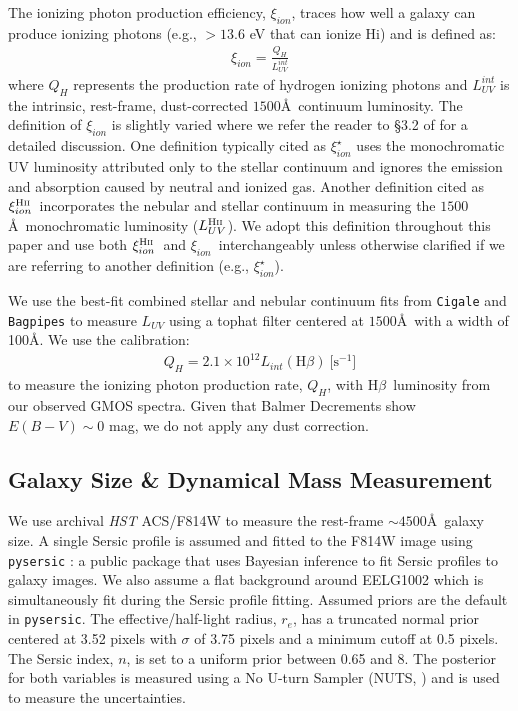 \documentclass[twocolumn,tight,times,linenumbers]{aastex631}
\newcommand{\hbeta}{H$\beta$}
\newcommand{\xiion}{$\xi_{ion}$}
\newcommand{\xiionHtwo}{$\xi_{ion}^\textrm{H{\sc ii}}$}
\begin{document}
	The ionizing photon production efficiency, \xiion, traces how well a galaxy can produce ionizing photons (e.g., $> 13.6$ eV that can ionize H{\sc i}) and is defined as:
	\begin{eqnarray}
		\textrm{\xiion} = \frac{Q_H}{L_{UV}^{int}}
		\label{eqn:xiion}
	\end{eqnarray}
	where $Q_H$ represents the production rate of hydrogen ionizing photons and $L_{UV}^{int}$ is the intrinsic, rest-frame, dust-corrected $1500$\AA~continuum luminosity. The definition of $\xi_{ion}$ is slightly varied where we refer the reader to \S3.2 of \cite{Chevallard2018} for a detailed discussion. One definition typically cited as $\xi_{ion}^\star$ uses the monochromatic UV luminosity attributed only to the stellar continuum and ignores the emission and absorption caused by neutral and ionized gas. Another definition cited as \xiionHtwo~incorporates the nebular and stellar continuum in measuring the $1500$\AA~monochromatic luminosity ($L_{UV}^\textrm{H{\sc ii}}$). We adopt this definition throughout this paper and use both \xiionHtwo~and \xiion~interchangeably unless otherwise clarified if we are referring to another definition (e.g., $\xi_{ion}^\star$).
	
	We use the best-fit combined stellar and nebular continuum fits from \texttt{Cigale} and \texttt{Bagpipes} to measure $L_{UV}$ using a tophat filter centered at $1500$\AA~with a width of 100\AA. We use the \cite{Leitherer1995} calibration:
	\begin{eqnarray}
		Q_H = 2.1\times10^{12} L_{int}(\textrm{H}\beta)~\textrm{[s$^{-1}$]}
	\end{eqnarray}
	to measure the ionizing photon production rate, $Q_H$, with \hbeta~luminosity from our observed GMOS spectra. Given that Balmer Decrements show $E(B-V) \sim 0$ mag, we do not apply any dust correction.

	\subsection{Galaxy Size \& Dynamical Mass Measurement}
	\label{sec:dynamical_mass}
	
	We use archival \textit{HST} ACS/F814W to measure the rest-frame $\sim 4500$\AA~galaxy size. A single Sersic profile is assumed and fitted to the F814W image using \texttt{pysersic} \citep{Pasha2023}: a public package that uses Bayesian inference to fit Sersic profiles to galaxy images. We also assume a flat background around EELG1002 which is simultaneously fit during the Sersic profile fitting. Assumed priors are the default in \texttt{pysersic}. The effective/half-light radius, $r_{e}$, has a truncated normal prior centered at 3.52 pixels with $\sigma$ of 3.75 pixels and a minimum cutoff at 0.5 pixels. The Sersic index, $n$, is set to a uniform prior between 0.65 and 8. The posterior for both variables is measured using a No U-turn Sampler (NUTS, \citealt{Hoffman2014}) and is used to measure the uncertainties.
	
\end{document}
